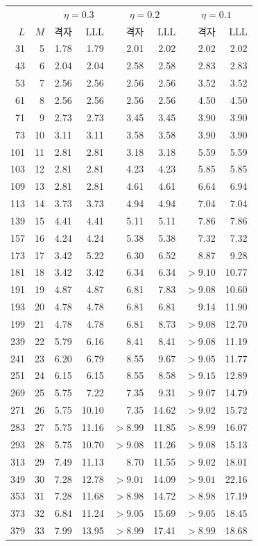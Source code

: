 \begin{tabular}{rrrrrrrr}
\toprule
& & \multicolumn{2}{c}{$\eta=0.3$} & \multicolumn{2}{c}{$\eta=0.2$} & \multicolumn{2}{c}{$\eta=0.1$}\\
$L$ & $M$ & 격자 & LLL & 격자 & LLL & 격자 & LLL\\
\midrule
31 & 5 & 1.78 & 1.79 & 2.01 & 2.02 & 2.02 & 2.02\\
43 & 6 & 2.04 & 2.04 & 2.58 & 2.58 & 2.83 & 2.83\\
53 & 7 & 2.56 & 2.56 & 2.56 & 2.56 & 3.52 & 3.52\\
61 & 8 & 2.56 & 2.56 & 2.56 & 2.56 & 4.50 & 4.50\\
71 & 9 & 2.73 & 2.73 & 3.45 & 3.45 & 3.90 & 3.90\\
73 & 10 & 3.11 & 3.11 & 3.58 & 3.58 & 3.90 & 3.90\\
101 & 11 & 2.81 & 2.81 & 3.18 & 3.18 & 5.59 & 5.59\\
103 & 12 & 2.81 & 2.81 & 4.23 & 4.23 & 5.85 & 5.85\\
109 & 13 & 2.81 & 2.81 & 4.61 & 4.61 & 6.64 & 6.94\\
113 & 14 & 3.73 & 3.73 & 4.94 & 4.94 & 7.04 & 7.04\\
139 & 15 & 4.41 & 4.41 & 5.11 & 5.11 & 7.86 & 7.86\\
157 & 16 & 4.24 & 4.24 & 5.38 & 5.38 & 7.32 & 7.32\\
173 & 17 & 3.42 & 5.22 & 6.30 & 6.52 & 8.87 & 9.28\\
181 & 18 & 3.42 & 3.42 & 6.34 & 6.34 & $>9.10$ & 10.77\\
191 & 19 & 4.87 & 4.87 & 6.81 & 7.83 & $>9.08$ & 10.60\\
193 & 20 & 4.78 & 4.78 & 6.81 & 6.81 & 9.14 & 11.90\\
199 & 21 & 4.78 & 4.78 & 6.81 & 8.73 & $>9.08$ & 12.70\\
239 & 22 & 5.79 & 6.16 & 8.41 & 8.41 & $>9.08$ & 11.19\\
241 & 23 & 6.20 & 6.79 & 8.55 & 9.67 & $>9.05$ & 11.77\\
251 & 24 & 6.15 & 6.15 & 8.55 & 8.58 & $>9.15$ & 12.89\\
269 & 25 & 5.75 & 7.22 & 7.35 & 9.31 & $>9.07$ & 14.79\\
271 & 26 & 5.75 & 10.10 & 7.35 & 14.62 & $>9.02$ & 15.72\\
283 & 27 & 5.75 & 11.16 & $>8.99$ & 11.85 & $>8.99$ & 16.07\\
293 & 28 & 5.75 & 10.70 & $>9.08$ & 11.26 & $>9.08$ & 15.13\\
313 & 29 & 7.49 & 11.13 & 8.70 & 11.55 & $>9.02$ & 18.01\\
349 & 30 & 7.28 & 12.78 & $>9.01$ & 14.09 & $>9.01$ & 22.16\\
353 & 31 & 7.28 & 11.68 & $>8.98$ & 14.72 & $>8.98$ & 17.19\\
373 & 32 & 6.84 & 11.24 & $>9.05$ & 15.69 & $>9.05$ & 18.45\\
379 & 33 & 7.99 & 13.95 & $>8.99$ & 17.41 & $>8.99$ & 18.68\\
\bottomrule
\end{tabular}